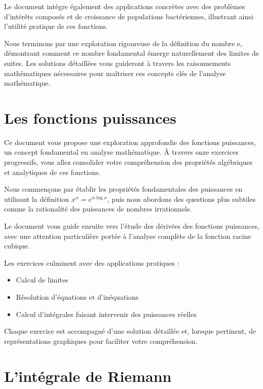 \documentclass[
  12pt,
  letterpaper,
]{book}
\providecommand{\tightlist}{%
  \setlength{\itemsep}{0pt}\setlength{\parskip}{0pt}}\usepackage{longtable,booktabs,array}
\theoremstyle{remark}
\begin{document}
Le document intègre également des applications concrètes avec des
problèmes d'intérêts composés et de croissance de populations
bactériennes, illustrant ainsi l'utilité pratique de ces fonctions.

Nous terminons par une exploration rigoureuse de la définition du nombre
e, démontrant comment ce nombre fondamental émerge naturellement des
limites de suites. Les solutions détaillées vous guideront à travers les
raisonnements mathématiques nécessaires pour maîtriser ces concepts clés
de l'analyse mathématique.

\hypertarget{les-fonctions-puissances}{%
\section*{Les fonctions puissances}\label{les-fonctions-puissances}}


Ce document vous propose une exploration approfondie des fonctions
puissances, un concept fondamental en analyse mathématique. À travers
onze exercices progressifs, vous allez consolider votre compréhension
des propriétés algébriques et analytiques de ces fonctions.

Nous commençons par établir les propriétés fondamentales des puissances
en utilisant la définition \(x^{\alpha} = e^{\alpha \log x}\), puis nous
abordons des questions plus subtiles comme la rationalité des puissances
de nombres irrationnels.

Le document vous guide ensuite vers l'étude des dérivées des fonctions
puissances, avec une attention particulière portée à l'analyse complète
de la fonction racine cubique.

Les exercices culminent avec des applications pratiques :

\begin{itemize}
\tightlist
\item
  Calcul de limites
\item
  Résolution d'équations et d'inéquations
\item
  Calcul d'intégrales faisant intervenir des puissances réelles
\end{itemize}

Chaque exercice est accompagné d'une solution détaillée et, lorsque
pertinent, de représentations graphiques pour faciliter votre
compréhension.

\hypertarget{lintuxe9grale-de-riemann}{%
\section*{L'intégrale de Riemann}\label{lintuxe9grale-de-riemann}}
\end{document}
